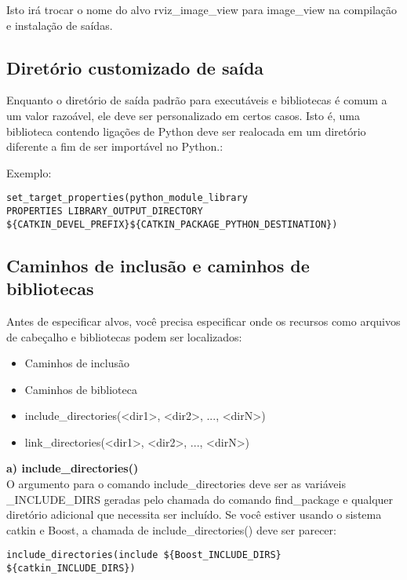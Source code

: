 Isto irá trocar o nome do alvo rviz\_image\_view para image\_view na compilação e instalação de saídas.

\subsection{Diretório customizado de saída}

Enquanto o diretório de saída padrão para executáveis e bibliotecas é comum a um valor razoável, ele deve ser personalizado em certos casos. Isto é, uma biblioteca contendo ligações de Python deve ser realocada em um diretório diferente a fim de ser importável no Python.:

Exemplo:

\begin{verbatim}
set_target_properties(python_module_library
PROPERTIES LIBRARY_OUTPUT_DIRECTORY ${CATKIN_DEVEL_PREFIX}${CATKIN_PACKAGE_PYTHON_DESTINATION})
\end{verbatim}

\subsection{Caminhos de inclusão e caminhos de bibliotecas}

Antes de especificar alvos, você precisa especificar onde os recursos como arquivos de cabeçalho e bibliotecas podem ser localizados:

\begin{itemize}
	\setlength{\itemsep}{1pt}
	\setlength{\parskip}{0pt}
	\setlength{\parsep}{0pt}
	\item[]Caminhos de inclusão  
	\item[]Caminhos de biblioteca
	\item[]include\_directories(<dir1>, <dir2>, ..., <dirN>)
	\item[]link\_directories(<dir1>, <dir2>, ..., <dirN>)
\end{itemize}

\textbf{a) include\_directories()} \\

O argumento para o comando include\_directories deve ser as variáveis \_INCLUDE\_DIRS  geradas pelo chamada do comando find\_package e qualquer diretório adicional que necessita ser incluído. Se você estiver usando o sistema catkin e Boost, a chamada de include\_directories() deve ser parecer:

\begin{verbatim}
include_directories(include ${Boost_INCLUDE_DIRS} ${catkin_INCLUDE_DIRS})
\end{verbatim}

